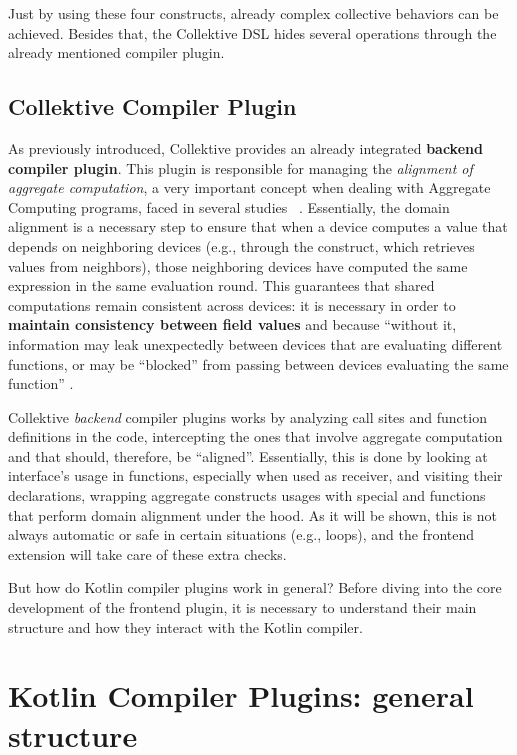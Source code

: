 \documentclass[12pt,a4paper,openright,twoside]{book}
\begin{document}
Just by using these four constructs, already complex collective behaviors can
be achieved. Besides that, the Collektive \ac{DSL} hides several operations through
the already mentioned compiler plugin. 

\subsection{Collektive Compiler Plugin}

As previously introduced, Collektive provides an already integrated
\textbf{backend compiler plugin}. This plugin is responsible for managing the
\emph{alignment of aggregate computation}, a very important concept when dealing
with Aggregate Computing programs, faced in several studies
\cite{DBLP:conf/forte/DamianiVPB15}~\cite{DBLP:conf/saso/AudritoDVC16}.
%
Essentially, the domain alignment is a necessary step to ensure that when a
device computes a value that depends on neighboring devices (e.g., through the
 construct, which retrieves values from neighbors), those
neighboring devices have computed the same expression in the same evaluation
round. This guarantees that shared computations remain consistent across
devices: it is necessary in order to \textbf{maintain consistency between field
values} and  because ``without it, information
may leak unexpectedly between devices that are evaluating different functions,
or may be “blocked” from passing between devices evaluating the same function''
\cite{DBLP:conf/forte/DamianiVPB15}.

Collektive \emph{backend} compiler plugins works by analyzing call sites and
function definitions in the code, intercepting the ones that involve aggregate
computation and that should, therefore, be ``aligned''. Essentially, this is
done by looking at  interface's usage in functions,
especially when used as receiver, and visiting their declarations, wrapping
aggregate constructs usages with special  and
 functions that perform domain alignment under the hood.
%
As it will be shown, this is not always automatic or safe in certain situations
(e.g., loops), and the frontend extension will take care of these extra checks. 

But how do Kotlin compiler plugins work in general? Before diving into the 
core development of the frontend plugin, it is necessary to understand their
main structure and how they interact with the Kotlin compiler.

\section{Kotlin Compiler Plugins: general structure} 
\end{document}

